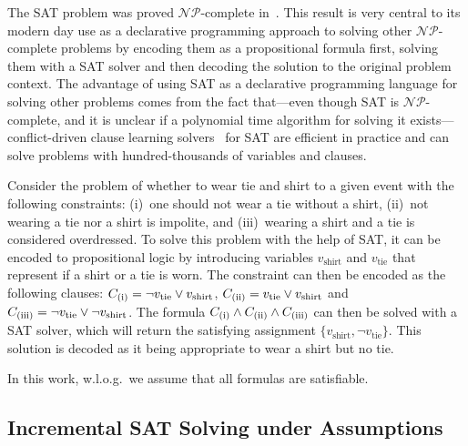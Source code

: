 The SAT problem was proved $\mathcal{NP}$-complete in~\textcite{DBLP:conf/stoc/Cook71}.
This result is very central to its modern day use as a declarative programming approach to solving other $\mathcal{NP}$-complete problems by encoding them as a propositional formula first, solving them with a SAT solver and then decoding the solution to the original problem context.
The advantage of using SAT as a declarative programming language for solving other problems comes from the fact that---even though SAT is $\mathcal{NP}$-complete, and it is unclear if a polynomial time algorithm for solving it exists---conflict-driven clause learning solvers~\autocite{handbook2-cdcl} for SAT are efficient in practice and can solve problems with hundred-thousands of variables and clauses.

\begin{example}
  Consider the problem of whether to wear tie and shirt to a given event with the following constraints:
  (i)~one should not wear a tie without a shirt, (ii)~not wearing a tie nor a shirt is impolite, and (iii)~wearing a shirt and a tie is considered overdressed.
  To solve this problem with the help of SAT, it can be encoded to propositional logic by introducing variables $v_\text{shirt}$ and $v_\text{tie}$ that represent if a shirt or a tie is worn.
  The constraint can then be encoded as the following clauses:
  $C_\text{(i)} = \lnot v_\text{tie} \lor v_\text{shirt}$, $C_\text{(ii)} = v_\text{tie} \lor v_\text{shirt}$ and $C_\text{(iii)} = \lnot v_\text{tie} \lor \lnot v_\text{shirt}$.
  The formula $C_\text{(i)} \land C_\text{(ii)} \land C_\text{(iii)}$ can then be solved with a SAT solver, which will return the satisfying assignment $\{ v_\text{shirt}, \lnot v_\text{tie} \}$.
  This solution is decoded as it being appropriate to wear a shirt but no tie.
\end{example}

In this work, w.l.o.g.\ we assume that all formulas are satisfiable.

\subsection{Incremental SAT Solving under Assumptions\label{sec:inc-sat}}

